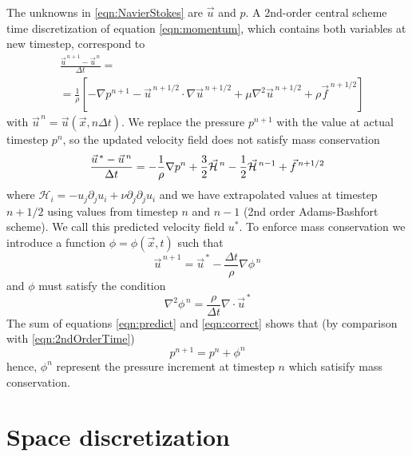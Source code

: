 \documentclass[a4paper,11pt]{report}
\begin{document}
The unknowns in \eqref{eqn:NavierStokes} are $\vec{u}$ and $p$. A 2nd-order central scheme time discretization of equation \eqref{eqn:momentum}, which contains both variables at new timestep, correspond to
\begin{equation}
    \label{eqn:2ndOrderTime}
    \begin{aligned}
        &\frac{\vec{u}^{\, n+1} - \vec{u}^{\, n}}{\Delta t} = \\
        &= \frac{1}{\rho}\left[-\nabla p^{n+1} - \vec{u}^{\, n+1/2} \cdot \nabla \vec{u}^{\, n+1/2} + \mu \nabla^2 \vec{u}^{\, n+1/2} + \rho \vec{f}^{\, n+1/2}\right]
    \end{aligned}
\end{equation}
with $\vec{u}^{\, n} = \vec{u}\left(\vec{x},n\Delta t\right)$.
We replace the pressure $p^{n+1}$ with the value at actual timestep $p^n$, so the updated velocity field does not satisfy mass conservation
\begin{equation}
    \label{eqn:predict}
    \frac{\vec{u}^{\, *} - \vec{u}^{\, n}}{\Delta t} = -\frac{1}{\rho}\nabla p^n + \frac{3}{2}\vec{\mathcal{H}}^{\, n} - \frac{1}{2}\vec{\mathcal{H}}^{\, n-1} + \vec{f}^{\, n+1/2}\\
\end{equation}
where $\mathcal{H}_i = -u_j\partial_j u_i + \nu \partial_j \partial_j u_i$ and we have extrapolated values at timestep $n+1/2$ using values from timestep $n$ and $n-1$ (2nd order Adams-Bashfort scheme). We call this predicted velocity field $u^{*}$. To enforce mass conservation we introduce a function $\phi = \phi\left(\vec{x},t\right)$ such that
\begin{equation}
    \label{eqn:correct}
    \vec{u}^{\, n+1} = \vec{u}^{\, *} - \frac{\Delta t}{\rho}\nabla \phi^{\, n}
\end{equation}
and $\phi$ must satisfy the condition
\begin{equation}
    \label{eqn:Poisson}
    \nabla^2 \phi^{\, n} = \frac{\rho}{\Delta t}\nabla \cdot \vec{u}^{\, *}
\end{equation}
The sum of equations \eqref{eqn:predict} and \eqref{eqn:correct} shows that (by comparison with \eqref{eqn:2ndOrderTime})
\begin{equation}
    p^{n+1} = p^{n} + \phi^{n}
\end{equation}
hence, $\phi^n$ represent the pressure increment at timestep $n$ which satisify mass conservation.

\section*{Space discretization}
\end{document}
